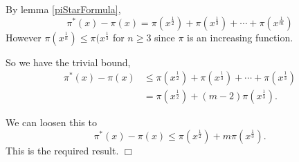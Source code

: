 \documentclass[10pt]{article}
\newenvironment{proof}[1][Proof]{\begin{trivlist}
\item[\hskip \labelsep {\bfseries #1}]}{\end{trivlist}}
\begin{document}
\begin{proof}
    By lemma \ref{piStarFormula}, 
    \begin{equation*}
        \pi^*(x)-\pi(x) = \pi(x^\frac{1}{2})+\pi(x^{\frac{1}{3}})+\cdots+\pi(x^\frac{1}{m})
    \end{equation*}
    However $\pi(x^\frac{1}{n}) \leq \pi(x^\frac{1}{3}$ for $n\geq 3$
    since $\pi$ is an increasing function.
    
    So we have 
    the trivial bound,
    \begin{align*}
        \pi^*(x)-\pi(x) &\leq \pi(x^\frac{1}{2})+\pi(x^\frac{1}{3})+\cdots+\pi(x^\frac{1}{3})   \\
        &= \pi(x^\frac{1}{2})+(m-2)\pi(x^\frac{1}{3}).
    \end{align*}
    
    
    We can loosen this to
    \begin{equation*}
        \pi^*(x)-\pi(x) \leq \pi(x^\frac{1}{2})+m\pi(x^\frac{1}{3}).
    \end{equation*}
    This is the required result. $\Box$
\end{proof}
\end{document}
